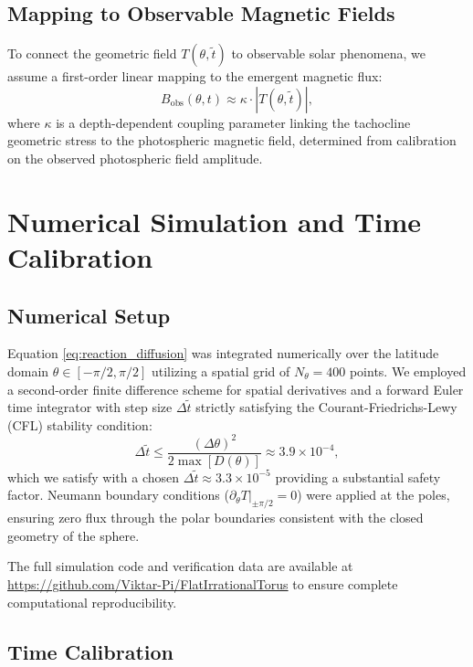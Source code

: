 \documentclass[aps, prd, onecolumn, 11pt, longbibliography, amsmath, amssymb]{revtex4-2}
\begin{document}
\subsection{Mapping to Observable Magnetic Fields}

To connect the geometric field $T(\theta, \tilde{t})$ to observable solar phenomena, we assume a first-order linear mapping to the emergent magnetic flux:
\begin{equation}
B_{\mathrm{obs}}(\theta, t) \approx \kappa \cdot |T(\theta, \tilde{t})|,
\end{equation}
where $\kappa$ is a depth-dependent coupling parameter linking the tachocline geometric stress to the photospheric magnetic field, determined from calibration on the observed photospheric field amplitude.

\section{Numerical Simulation and Time Calibration}

\subsection{Numerical Setup}

Equation \eqref{eq:reaction_diffusion} was integrated numerically over the latitude domain $\theta \in [-\pi/2, \pi/2]$ utilizing a spatial grid of $N_\theta = 400$ points. We employed a second-order finite difference scheme for spatial derivatives and a forward Euler time integrator with step size $\Delta \tilde{t}$ strictly satisfying the Courant-Friedrichs-Lewy (CFL) stability condition:
\begin{equation}
\Delta \tilde{t} \leq \frac{(\Delta\theta)^2}{2\max[D(\theta)]} \approx 3.9 \times 10^{-4},
\end{equation}
which we satisfy with a chosen $\Delta \tilde{t} \approx 3.3 \times 10^{-5}$ providing a substantial safety factor. Neumann boundary conditions ($\partial_\theta T|_{\pm \pi/2} = 0$) were applied at the poles, ensuring zero flux through the polar boundaries consistent with the closed geometry of the sphere.

The full simulation code and verification data are available at \url{https://github.com/Viktar-Pi/FlatIrrationalTorus} to ensure complete computational reproducibility.

\subsection{Time Calibration}
\end{document}
